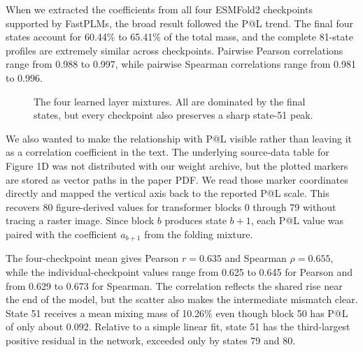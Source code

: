 \documentclass[11pt]{article}
\newcommand{\ESMFold}{ESMFold2\xspace}
\begin{document}
When we extracted the coefficients from all four \ESMFold checkpoints supported by FastPLMs, the broad result followed the P@L trend. The final four states account for 60.44\% to 65.41\% of the total mass, and the complete 81-state profiles are extremely similar across checkpoints. Pairwise Pearson correlations range from 0.988 to 0.997, while pairwise Spearman correlations range from 0.981 to 0.996.

\begin{figure}[H]
\centering
{}
\caption{The four learned layer mixtures. All are dominated by the final states, but every checkpoint also preserves a sharp state-51 peak.}
\label{fig:mixer}
\end{figure}

We also wanted to make the relationship with P@L visible rather than leaving it as a correlation coefficient in the text. The underlying source-data table for Figure 1D was not distributed with our weight archive, but the plotted markers are stored as vector paths in the paper PDF. We read those marker coordinates directly and mapped the vertical axis back to the reported P@L scale. This recovers 80 figure-derived values for transformer blocks 0 through 79 without tracing a raster image. Since block $b$ produces state $b+1$, each P@L value was paired with the coefficient $a_{b+1}$ from the folding mixture.

The four-checkpoint mean gives Pearson $r=0.635$ and Spearman $\rho=0.655$, while the individual-checkpoint values range from 0.625 to 0.645 for Pearson and from 0.629 to 0.673 for Spearman. The correlation reflects the shared rise near the end of the model, but the scatter also makes the intermediate mismatch clear. State 51 receives a mean mixing mass of 10.26\% even though block 50 has P@L of only about 0.092. Relative to a simple linear fit, state 51 has the third-largest positive residual in the network, exceeded only by states 79 and 80.
\end{document}

